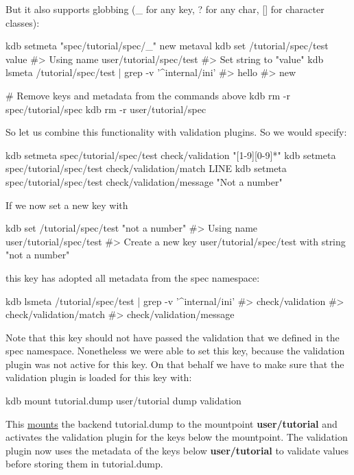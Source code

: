 But it also supports globbing ({\ttfamily \+\_\+} for any key, {\ttfamily ?} for any char, {\ttfamily \mbox{[}\mbox{]}} for character classes)\+:


\begin{DoxyCode}
kdb setmeta "spec/tutorial/spec/\_" new metaval
kdb set /tutorial/spec/test value
#> Using name user/tutorial/spec/test
#> Set string to "value"
kdb lsmeta /tutorial/spec/test | grep -v '^internal/ini'
#> hello
#> new

# Remove keys and metadata from the commands above
kdb rm -r spec/tutorial/spec
kdb rm -r user/tutorial/spec
\end{DoxyCode}


So let us combine this functionality with validation plugins. So we would specify\+:


\begin{DoxyCode}
kdb setmeta spec/tutorial/spec/test check/validation "[1-9][0-9]*"
kdb setmeta spec/tutorial/spec/test check/validation/match LINE
kdb setmeta spec/tutorial/spec/test check/validation/message "Not a number"
\end{DoxyCode}


If we now set a new key with 
\begin{DoxyCode}
kdb set /tutorial/spec/test "not a number"
#> Using name user/tutorial/spec/test
#> Create a new key user/tutorial/spec/test with string "not a number"
\end{DoxyCode}
 this key has adopted all metadata from the spec namespace\+: 
\begin{DoxyCode}
kdb lsmeta /tutorial/spec/test | grep -v '^internal/ini'
#> check/validation
#> check/validation/match
#> check/validation/message
\end{DoxyCode}
 Note that this key should not have passed the validation that we defined in the spec namespace. Nonetheless we were able to set this key, because the validation plugin was not active for this key. On that behalf we have to make sure that the validation plugin is loaded for this key with\+: 
\begin{DoxyCode}
kdb mount tutorial.dump user/tutorial dump validation
\end{DoxyCode}
 This \hyperlink{doc_tutorials_mount_md}{mounts} the backend {\ttfamily tutorial.\+dump} to the mountpoint {\bfseries user/tutorial} and activates the validation plugin for the keys below the mountpoint. The validation plugin now uses the metadata of the keys below {\bfseries user/tutorial} to validate values before storing them in {\ttfamily tutorial.\+dump}.

